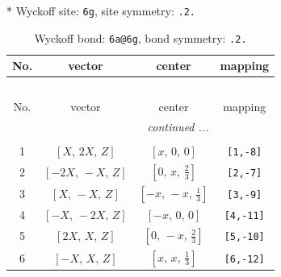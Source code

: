 \documentclass[fleqn,8pt]{jsarticle}
\begin{document}
* Wyckoff site: {\tt 6g}, site symmetry: {\tt .2.}
\renewcommand{\arraystretch}{1.2}
\begin{longtable}{cccc}
\caption{Wyckoff bond: {\tt 6a@6g}, bond symmetry: {\tt .2.}}
 \\
 \hline \hline
No. & vector & center & mapping \\ \hline \endfirsthead

\multicolumn{3}{l}{\tablename\ \thetable{}} \\
 \hline \hline
No. & vector & center & mapping \\ \hline \endhead

 \hline \hline
\multicolumn{3}{r}{\footnotesize\it continued ...} \\ \endfoot

 \hline \hline
\multicolumn{3}{r}{} \\ \endlastfoot

1 & $\left[ X,\, 2 X,\, Z \right]$ & $\left[ x,\, 0,\, 0 \right]$ & {\tt [1,-8]} \\ \hline
2 & $\left[ - 2 X,\, - X,\, Z \right]$ & $\left[ 0,\, x,\, \frac{2}{3} \right]$ & {\tt [2,-7]} \\ \hline
3 & $\left[ X,\, - X,\, Z \right]$ & $\left[ - x,\, - x,\, \frac{1}{3} \right]$ & {\tt [3,-9]} \\ \hline
4 & $\left[ - X,\, - 2 X,\, Z \right]$ & $\left[ - x,\, 0,\, 0 \right]$ & {\tt [4,-11]} \\ \hline
5 & $\left[ 2 X,\, X,\, Z \right]$ & $\left[ 0,\, - x,\, \frac{2}{3} \right]$ & {\tt [5,-10]} \\ \hline
6 & $\left[ - X,\, X,\, Z \right]$ & $\left[ x,\, x,\, \frac{1}{3} \right]$ & {\tt [6,-12]} \\
\end{longtable}
\renewcommand{\arraystretch}{1.2}
\end{document}
